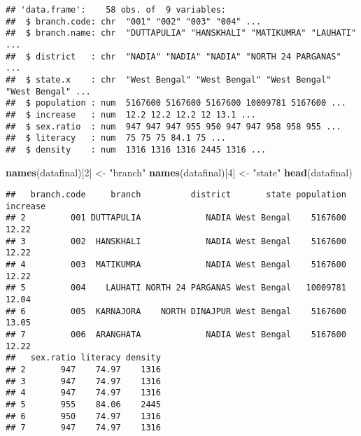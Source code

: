 \documentclass[]{article}
\newenvironment{Shaded}{\begin{snugshade}}{\end{snugshade}}
\newcommand{\KeywordTok}[1]{\textcolor[rgb]{0.13,0.29,0.53}{\textbf{#1}}}
\newcommand{\DataTypeTok}[1]{\textcolor[rgb]{0.13,0.29,0.53}{#1}}
\newcommand{\DecValTok}[1]{\textcolor[rgb]{0.00,0.00,0.81}{#1}}
\newcommand{\StringTok}[1]{\textcolor[rgb]{0.31,0.60,0.02}{#1}}
\newcommand{\CommentTok}[1]{\textcolor[rgb]{0.56,0.35,0.01}{\textit{#1}}}
\newcommand{\OperatorTok}[1]{\textcolor[rgb]{0.81,0.36,0.00}{\textbf{#1}}}
\newcommand{\NormalTok}[1]{#1}
\begin{document}
\begin{verbatim}
## 'data.frame':    58 obs. of  9 variables:
##  $ branch.code: chr  "001" "002" "003" "004" ...
##  $ branch.name: chr  "DUTTAPULIA" "HANSKHALI" "MATIKUMRA" "LAUHATI" ...
##  $ district   : chr  "NADIA" "NADIA" "NADIA" "NORTH 24 PARGANAS" ...
##  $ state.x    : chr  "West Bengal" "West Bengal" "West Bengal" "West Bengal" ...
##  $ population : num  5167600 5167600 5167600 10009781 5167600 ...
##  $ increase   : num  12.2 12.2 12.2 12 13.1 ...
##  $ sex.ratio  : num  947 947 947 955 950 947 947 958 958 955 ...
##  $ literacy   : num  75 75 75 84.1 75 ...
##  $ density    : num  1316 1316 1316 2445 1316 ...
\end{verbatim}

\begin{Shaded}
\begin{Highlighting}[]
\KeywordTok{names}\NormalTok{(datafinal)[}\DecValTok{2}\NormalTok{] <-}\StringTok{ "branch"} 
\KeywordTok{names}\NormalTok{(datafinal)[}\DecValTok{4}\NormalTok{] <-}\StringTok{ "state"}
\KeywordTok{head}\NormalTok{(datafinal)}
\end{Highlighting}
\end{Shaded}

\begin{verbatim}
##   branch.code     branch          district       state population increase
## 2         001 DUTTAPULIA             NADIA West Bengal    5167600    12.22
## 3         002  HANSKHALI             NADIA West Bengal    5167600    12.22
## 4         003  MATIKUMRA             NADIA West Bengal    5167600    12.22
## 5         004    LAUHATI NORTH 24 PARGANAS West Bengal   10009781    12.04
## 6         005  KARNAJORA    NORTH DINAJPUR West Bengal    5167600    13.05
## 7         006  ARANGHATA             NADIA West Bengal    5167600    12.22
##   sex.ratio literacy density
## 2       947    74.97    1316
## 3       947    74.97    1316
## 4       947    74.97    1316
## 5       955    84.06    2445
## 6       950    74.97    1316
## 7       947    74.97    1316
\end{verbatim}

\begin{Shaded}
\end{Shaded}
\end{document}
